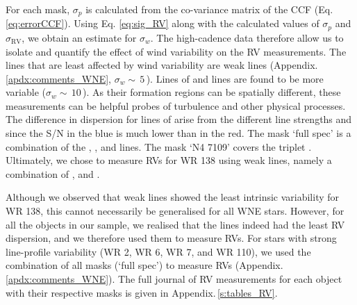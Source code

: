 For each mask, $\sigma_p$ is calculated from the co-variance matrix of the CCF (Eq. \ref{eq:errorCCF}). Using Eq. \ref{eq:sig_RV} along with the calculated values of $\sigma_p$ and $\sigma_{\textrm{RV}}$, we obtain an estimate for $\sigma_w$. The high-cadence data therefore allow us to isolate and quantify the effect of wind variability on the RV measurements. The lines that are least affected by wind variability are \nv{} weak lines (Appendix. \ref{apdx:comments_WNE}, $\sigma_w{\sim}\,5$\,\kms{}). Lines of \heii{} and \niv{} lines are found to be more variable ($\sigma_w{\sim}\,10$\,\kms{}). As their formation regions can be spatially different, these measurements can be helpful probes of turbulence and other physical processes. The difference in dispersion for lines of \niv{} arise from the different line strengths and since the S/N in the blue is much lower than in the red. The mask `full spec' is a combination of the \niv{}, \heii,{} and \nv{} lines. The mask `N4 7109' covers the triplet \NIVred{}. Ultimately, we chose to measure RVs for WR 138 using weak \nv{} lines, namely a combination of \NVblue,{} and \NVred{}.

Although we observed that weak \nv{} lines showed the least intrinsic variability for WR 138, this  cannot necessarily be generalised for all WNE stars. However, for all the objects in our sample, we realised that the \nv{} lines indeed had the least RV dispersion, and we therefore used them to measure RVs. For stars with strong line-profile variability (WR 2, WR 6, WR 7, and WR 110), we used the combination of all masks (`full spec') to measure RVs (Appendix.\,\ref{apdx:comments_WNE}). The full journal of RV measurements for each object with their respective masks is given in Appendix.\,\ref{s:tables_RV}.

